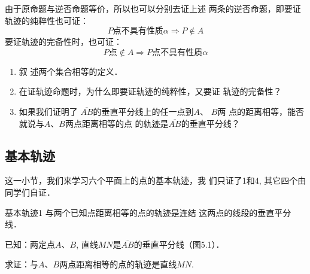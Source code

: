 由于原命题与逆否命题等价，所以也可以分别去证上述
两条的逆否命题，即要证轨迹的纯粹性也可证：
\[P\text{点不具有性质}\alpha\Rightarrow P\notin A\]
要证轨迹的完备性时，也可证：
\[P\text{点}\notin A\Rightarrow P\text{点不具有性质}\alpha\]

\begin{ex}
\begin{enumerate}
\item 叙
述两个集合相等的定义．
\item 在证轨迹命题时，为什么即要证轨迹的纯粹性，又要证
轨迹的完备性？
\item 如果我们证明了
$\overline{AB}$的垂直平分线上的任一点到$A$、
$B$两
点的距离相等，能否就说与$A$、$B$两点距离相等的点
的轨迹是$\overline{AB}$的垂直平分线？
\end{enumerate}
\end{ex}


\subsection{基本轨迹}
这一小节，我们来学习六个平面上的点的基本轨迹，我
们只证了1和4, 其它四个由同学们自证．

\begin{blk}{基本轨迹1}
与两个已知点距离相等的点的轨迹是连结
这两点的线段的垂直平分线．
\end{blk}

已知：两定点$A$、$B$, 直线$MN$是$\overline{AB}$的垂直平分线（图5.1）．

求证：与$A$、$B$两点距离相等的点的轨迹是直线$MN$.

\begin{figure}[htp]
    \centering
{}
    \caption{}
\end{figure}


